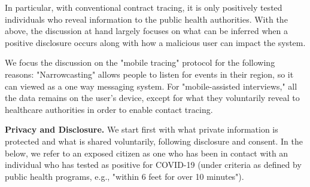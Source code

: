 \documentclass{article}
\begin{document}
In particular, with conventional contract tracing, it is only positively tested individuals who reveal information to the public health authorities. With the above, the discussion at hand largely focuses on what can be inferred when a positive disclosure occurs along with how a malicious user can impact the system.

We focus the discussion on the "mobile tracing" protocol for the following reasons:  "Narrowcasting" allows people to listen for events in their region, so it can viewed as a one way messaging system. For "mobile-assisted interviews," all the data remains on the user's device, except for what they voluntarily reveal to healthcare authorities in order to enable contact tracing.



\textbf{Privacy and Disclosure.} We start first with what private information is protected and what is shared voluntarily, following disclosure and consent. In the below, we refer to an exposed citizen as one who has been in contact with an individual who has tested as positive for COVID-19 (under criteria as defined by public health programs, e.g., "within 6 feet for over 10 minutes").


\end{document}
